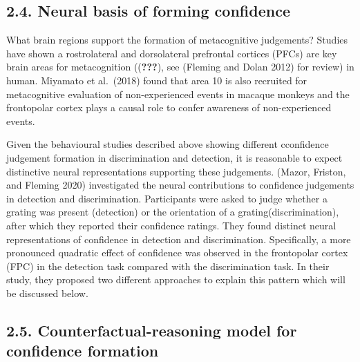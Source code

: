\documentclass[
]{article}
\begin{document}
\hypertarget{neural-basis-of-forming-confidence}{%
\subsection{2.4. Neural basis of forming
confidence}\label{neural-basis-of-forming-confidence}}

What brain regions support the formation of metacognitive judgements?
Studies have shown a rostrolateral and dorsolateral prefrontal cortices
(PFCs) are key brain areas for metacognition (({\textbf{???}}), see
(Fleming and Dolan 2012) for review) in human. Miyamato et al.~(2018)
found that area 10 is also recruited for metacognitive evaluation of
non-experienced events in macaque monkeys and the frontopolar cortex
plays a causal role to confer awareness of non-experienced events.

Given the behavioural studies described above showing different
cconfidence judgement formation in discrimination and detection, it is
reasonable to expect distinctive neural representations supporting these
judgements. (Mazor, Friston, and Fleming 2020) investigated the neural
contributions to confidence judgements in detection and discrimination.
Participants were asked to judge whether a grating was present
(detection) or the orientation of a grating(discrimination), after which
they reported their confidence ratings. They found distinct neural
representations of confidence in detection and discrimination.
Specifically, a more pronounced quadratic effect of confidence was
observed in the frontopolar cortex (FPC) in the detection task compared
with the discrimination task. In their study, they proposed two
different approaches to explain this pattern which will be discussed
below.

\hypertarget{counterfactual-reasoning-model-for-confidence-formation}{%
\subsection{2.5. Counterfactual-reasoning model for confidence
formation}\label{counterfactual-reasoning-model-for-confidence-formation}}
\end{document}
